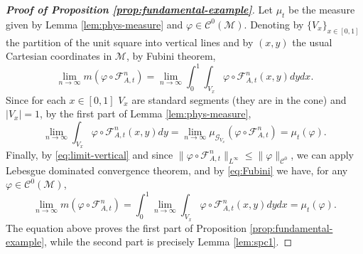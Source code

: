 \documentclass{amsart}
\numberwithin{equation}{section}
\newcommand\vf{\varphi}
\renewcommand{\le}{\leqslant}
\newcommand\cC{{\mathcal C}}
\newcommand\cF{{\mathcal F}}
\newcommand\cG{{\mathcal G}}
\newcommand\cM{{\mathcal M}}
\newcommand{\catt}{\cF_{A,t}}
\begin{document}
\begin{proof}[\textbf{Proof of Proposition \ref{prop:fundamental-example}}]
Let \(\mu_t\) be the measure given by Lemma \ref{lem:phys-measure} and \(\vf \in \cC^0(\cM)\). Denoting by \(\{V_x\}_{x \in [0,1]}\) the partition of the unit square into vertical lines and by \((x,y)\) the usual Cartesian coordinates in \(\cM\), by Fubini theorem, 
\begin{equation}\label{eq:Fubini}
\lim_{n \to \infty} m \left( \vf \circ \catt^n\right) = \lim_{n \to \infty}\int_{0}^1 \int_{V_x} \vf \circ \catt^n(x, y) dy dx.
\end{equation}
Since for each \(x \in [0,1]\) \(V_x\) are standard segments (they are in the cone) and \(|V_x| =1\), by the first part of Lemma \ref{lem:phys-measure},
\begin{equation}\label{eq:limit-vertical}
\lim_{n \to \infty} \int_{V_x} \vf \circ \catt^n(x,y) dy = \lim_{n \to \infty} \mu_{\cG_{V_x}} (\vf \circ \catt^n) =  \mu_t(\vf).
\end{equation}
Finally, by \eqref{eq:limit-vertical} and since \(\| \vf \circ \catt^n\|_{L^{\infty}} \le \|\vf\|_{\cC^0}\), we can apply Lebesgue dominated convergence theorem, and by \eqref{eq:Fubini} we have, for any \(\vf \in \cC^0(\cM)\),
\[
 \lim_{n \to \infty} m \left( \vf \circ \catt^n\right)= \int_{0}^1  \lim_{n \to \infty} \int_{V_x} \vf \circ \catt^n(x, y) dy dx = \mu_t (\vf).
\]
The equation above proves the first part of Proposition \ref{prop:fundamental-example}, while the second part is precisely Lemma \ref{lem:spc1}.
\end{proof}


\newpage

\appendix
\end{document}
